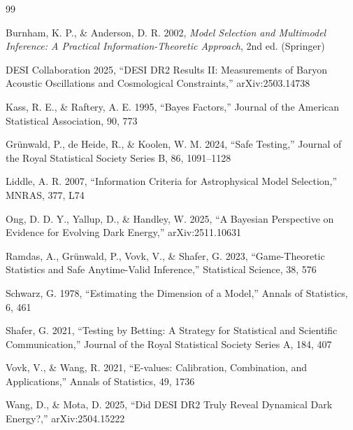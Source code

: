 \documentclass[11pt,a4paper]{article}
\begin{document}

\begin{thebibliography}{99}

Burnham, K. P., \& Anderson, D. R. 2002, \textit{Model Selection and Multimodel Inference: A Practical Information-Theoretic Approach}, 2nd ed. (Springer)

DESI Collaboration 2025, ``DESI DR2 Results II: Measurements of Baryon Acoustic Oscillations and Cosmological Constraints,'' arXiv:2503.14738

Kass, R. E., \& Raftery, A. E. 1995, ``Bayes Factors,'' Journal of the American Statistical Association, 90, 773

Gr{\"u}nwald, P., de Heide, R., \& Koolen, W. M. 2024, ``Safe Testing,'' Journal of the Royal Statistical Society Series B, 86, 1091--1128

Liddle, A. R. 2007, ``Information Criteria for Astrophysical Model Selection,'' MNRAS, 377, L74

Ong, D. D. Y., Yallup, D., \& Handley, W. 2025, ``A Bayesian Perspective on Evidence for Evolving Dark Energy,'' arXiv:2511.10631

Ramdas, A., Gr{\"u}nwald, P., Vovk, V., \& Shafer, G. 2023, ``Game-Theoretic Statistics and Safe Anytime-Valid Inference,'' Statistical Science, 38, 576

Schwarz, G. 1978, ``Estimating the Dimension of a Model,'' Annals of Statistics, 6, 461

Shafer, G. 2021, ``Testing by Betting: A Strategy for Statistical and Scientific Communication,'' Journal of the Royal Statistical Society Series A, 184, 407

Vovk, V., \& Wang, R. 2021, ``E-values: Calibration, Combination, and Applications,'' Annals of Statistics, 49, 1736

Wang, D., \& Mota, D. 2025, ``Did DESI DR2 Truly Reveal Dynamical Dark Energy?,'' arXiv:2504.15222

\end{thebibliography}
\end{document}
